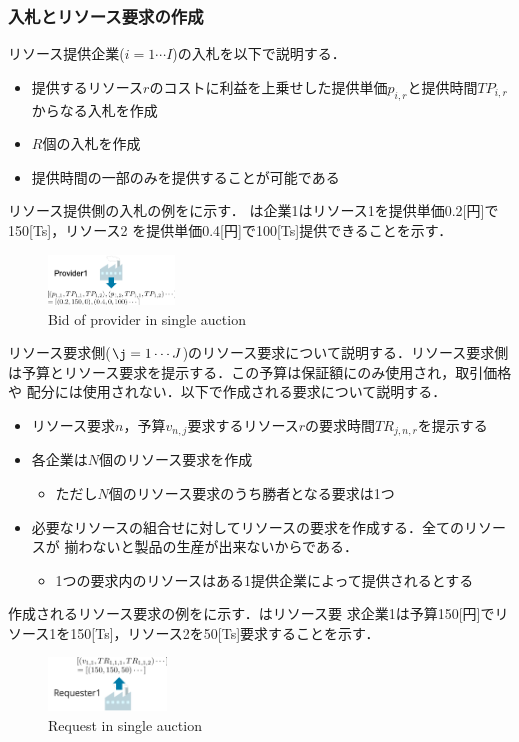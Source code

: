 \documentclass{ujarticle}
\begin{document}
\subsubsection{入札とリソース要求の作成}
リソース提供企業($i=1 \cdots I$)の入札を以下で説明する．
\begin{itemize}
\item {提供するリソース$r$のコストに利益を上乗せした提供単価$p_{i,r}$と提供時間$TP_{i,r}$からなる入札を作成}
\item {$R$個の入札を作成}
\item {提供時間の一部のみを提供することが可能である}
\end{itemize}
リソース提供側の入札の例をに示す．
は企業1はリソース1を提供単価0.2[円]で150[Ts]，リソース2
を提供単価0.4[円]で100[Ts]提供できることを示す．
\par
\begin{figure}[htb]
  \centering
  \includegraphics[width=0.3\textwidth]{bid-provider-single.png} 
  \caption{Bid of provider in single auction}
  \label{fig:bid-provider-single}
\end{figure}
リソース要求側($\j=1 \cdots J$)のリソース要求について説明する．リソース要求側は予算とリソース要求を提示する．この予算は保証額にのみ使用され，取引価格や
配分には使用されない．以下で作成される要求について説明する．
\begin{itemize}
\item {リソース要求$n$，予算$v_{n,j}$要求するリソース$r$の要求時間$TR_{j,n,r}$を提示する} 
\item {各企業は$N$個のリソース要求を作成}
  \begin{itemize}
  \item {ただし$N$個のリソース要求のうち勝者となる要求は1つ} 
  \end{itemize}
\item {必要なリソースの組合せに対してリソースの要求を作成する．全てのリソースが
    揃わないと製品の生産が出来ないからである．}
    \begin{itemize}
    \item {1つの要求内のリソースはある1提供企業によって提供されるとする}
    \end{itemize}
\end{itemize}
作成されるリソース要求の例をに示す．はリソース要
求企業1は予算150[円]でリソース1を150[Ts]，リソース2を50[Ts]要求することを示す．
\begin{figure}[htb]
  \centering
  \includegraphics[width=0.28\textwidth]{bid-requester.png} 
  \caption{Request in single auction}
  \label{fig:request}
\end{figure}
\end{document}
